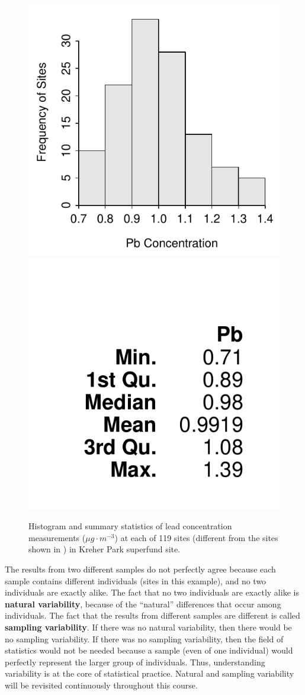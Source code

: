 \documentclass[10pt,openany]{book}\usepackage[]{graphicx}\usepackage[]{color}
\newenvironment{knitrout}{}{} %
\begin{document}
\begin{knitrout}
\color{fgcolor}\begin{figure}[hbtp]

{\centering \includegraphics[width=.4\linewidth]{Figs/KreherParkPbhist1-1} 
\includegraphics[width=.4\linewidth]{Figs/KreherParkPbhist1-2} 

}

\caption[Kreher Park 1]{Histogram and summary statistics of lead concentration measurements ($\mu g \cdot m^{-3}$) at each of 119 sites (different from the sites shown in ) in Kreher Park superfund site.}\label{fig:KreherParkPbhist1}
\end{figure}


\end{knitrout}

The results from two different samples do not perfectly agree because each sample contains different individuals (sites in this example), and no two individuals are exactly alike. The fact that no two individuals are exactly alike is \textbf{natural variability}, because of the ``natural'' differences that occur among individuals. The fact that the results from different samples are different is called \textbf{sampling variability}. If there was no natural variability, then there would be no sampling variability. If there was no sampling variability, then the field of statistics would not be needed because a sample (even of one individual) would perfectly represent the larger group of individuals. Thus, understanding variability is at the core of statistical practice. Natural and sampling variability will be revisited continuously throughout this course.
\end{document}
